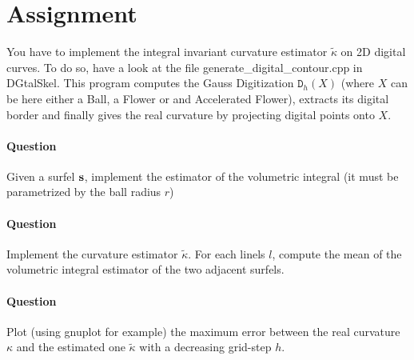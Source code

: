 \documentclass[a4paper, 11pt]{article}
\begin{document}
\section*{Assignment}

You have to implement the integral invariant curvature estimator $\tilde{\kappa}$ on 2D digital curves. To do so, have a look at the file generate\_digital\_contour.cpp in DGtalSkel.
This program computes the Gauss Digitization $\mathtt{D}_h(X)$ (where $X$ can be here either a Ball, a Flower or and Accelerated Flower), extracts its digital border
and finally gives the real curvature by projecting digital points onto $X$.

\paragraph{Question} Given a surfel $\bf{s}$, implement the estimator of the volumetric integral (it must be parametrized by the ball radius $r$)

\paragraph{Question} Implement the curvature estimator $\tilde{\kappa}$. For each linels $l$, compute the mean of the volumetric integral estimator of the two adjacent surfels.

\paragraph{Question} Plot (using gnuplot for example) the maximum error between the real curvature $\kappa$ and the estimated one $\tilde{\kappa}$ with a decreasing grid-step $h$.
\end{document}
